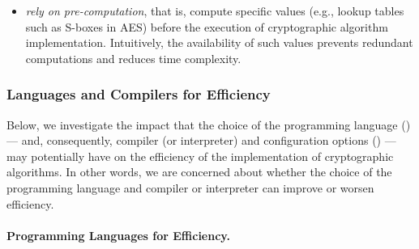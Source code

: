 \begin{itemize}
\begin{itemize}
\begin{itemize}
		\end{itemize} 
		
		In general, complex arithmetic operations in cryptographic algorithm implementations may be more or less (memory) efficient according to how data are represented. For instance, a point on an elliptic curve is often stored as the $x$-coordinate only of an affine point $(x,y)$. However, computations performed on the projective plane $(x,y,z)$ are more efficient as they avoid the costly inversions typically needed in affine coordinates. On top of that, mixed operations between projective and affine coordinates allow for the direct use of large pre-computation tables, further enhancing performance;\footnote{A comprehensive list of formulae for each curve can be found in the Explicit-Formula Database (EFD) available at \url{https://www.hyperelliptic.org/EFD/}}
		
		\item \textit{rely on pre-computation}, that is, compute specific values (e.g., lookup tables such as S-boxes in AES) before the execution of cryptographic algorithm implementation. Intuitively, the availability of such values prevents redundant computations and reduces time complexity.
		
	\end{itemize}
	
\end{itemize}





\subsubsection{Languages and Compilers for Efficiency}\label{sec:security_of_cryptographic_algorithms:performance:languages_and_compilers}

Below, we investigate the impact that the choice of the programming language () --- and, consequently, compiler (or interpreter) and configuration options () --- may potentially have on the efficiency of the implementation of cryptographic algorithms. In other words, we are concerned about whether the choice of the programming language and compiler or interpreter can improve or worsen efficiency.


\paragraph*{Programming Languages for Efficiency.}

